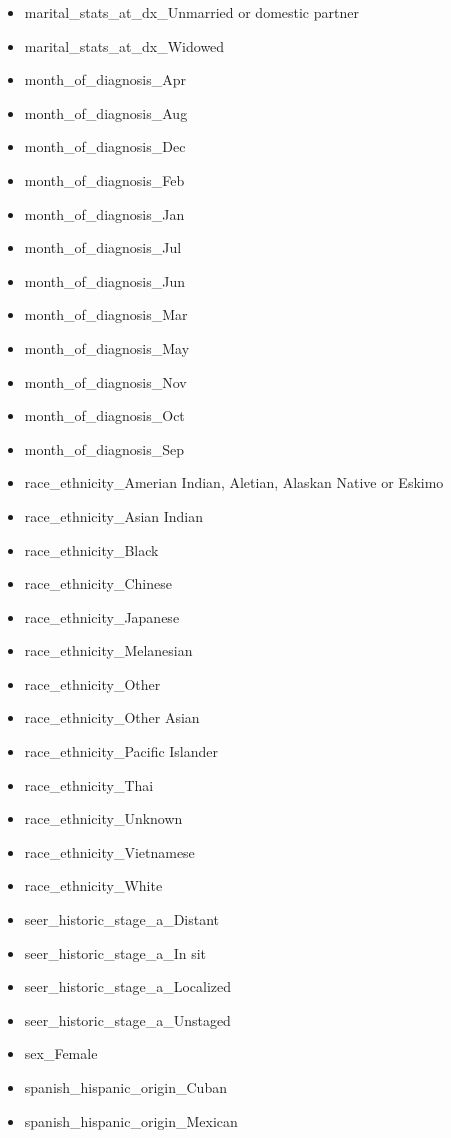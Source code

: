 \documentclass[a4paper,11pt]{article}
\begin{document}
\begin{itemize}[noitemsep]
\item marital\_stats\_at\_dx\_Unmarried or domestic partner
\item marital\_stats\_at\_dx\_Widowed
\item month\_of\_diagnosis\_Apr
\item month\_of\_diagnosis\_Aug
\item month\_of\_diagnosis\_Dec
\item month\_of\_diagnosis\_Feb
\item month\_of\_diagnosis\_Jan
\item month\_of\_diagnosis\_Jul
\item month\_of\_diagnosis\_Jun
\item month\_of\_diagnosis\_Mar
\item month\_of\_diagnosis\_May
\item month\_of\_diagnosis\_Nov
\item month\_of\_diagnosis\_Oct
\item month\_of\_diagnosis\_Sep
\item race\_ethnicity\_Amerian Indian, Aletian, Alaskan Native or Eskimo
\item race\_ethnicity\_Asian Indian
\item race\_ethnicity\_Black
\item race\_ethnicity\_Chinese
\item race\_ethnicity\_Japanese
\item race\_ethnicity\_Melanesian
\item race\_ethnicity\_Other
\item race\_ethnicity\_Other Asian
\item race\_ethnicity\_Pacific Islander
\item race\_ethnicity\_Thai
\item race\_ethnicity\_Unknown
\item race\_ethnicity\_Vietnamese
\item race\_ethnicity\_White
\item seer\_historic\_stage\_a\_Distant
\item seer\_historic\_stage\_a\_In sit
\item seer\_historic\_stage\_a\_Localized
\item seer\_historic\_stage\_a\_Unstaged
\item sex\_Female
\item spanish\_hispanic\_origin\_Cuban
\item spanish\_hispanic\_origin\_Mexican

\end{itemize}
\end{document}
